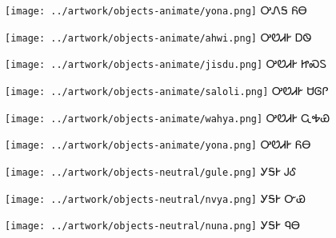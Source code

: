 \documentclass[avery5371]{flashcards}%
\begin{document}
\begin{flashcard}{
\texttt{[image: ../artwork/objects-animate/yona.png]}
}\Huge ᎤᏁᎦ ᏲᎾ
\end{flashcard}

\begin{flashcard}{
\texttt{[image: ../artwork/objects-animate/ahwi.png]}
}\Huge ᎤᏬᏗᎨ ᎠᏫ
\end{flashcard}

\begin{flashcard}{
\texttt{[image: ../artwork/objects-animate/jisdu.png]}
}\Huge ᎤᏬᏗᎨ ᏥᏍᏚ
\end{flashcard}

\begin{flashcard}{
\texttt{[image: ../artwork/objects-animate/saloli.png]}
}\Huge ᎤᏬᏗᎨ ᏌᎶᎵ
\end{flashcard}

\begin{flashcard}{
\texttt{[image: ../artwork/objects-animate/wahya.png]}
}\Huge ᎤᏬᏗᎨ ᏩᎭᏯ
\end{flashcard}

\begin{flashcard}{
\texttt{[image: ../artwork/objects-animate/yona.png]}
}\Huge ᎤᏬᏗᎨ ᏲᎾ
\end{flashcard}

\begin{flashcard}{
\texttt{[image: ../artwork/objects-neutral/gule.png]}
}\Huge ᎩᎦᎨ ᎫᎴ
\end{flashcard}

\begin{flashcard}{
\texttt{[image: ../artwork/objects-neutral/nvya.png]}
}\Huge ᎩᎦᎨ ᏅᏯ
\end{flashcard}

\begin{flashcard}{
\texttt{[image: ../artwork/objects-neutral/nuna.png]}
}\Huge ᎩᎦᎨ ᏄᎾ
\end{flashcard}
\end{document}
